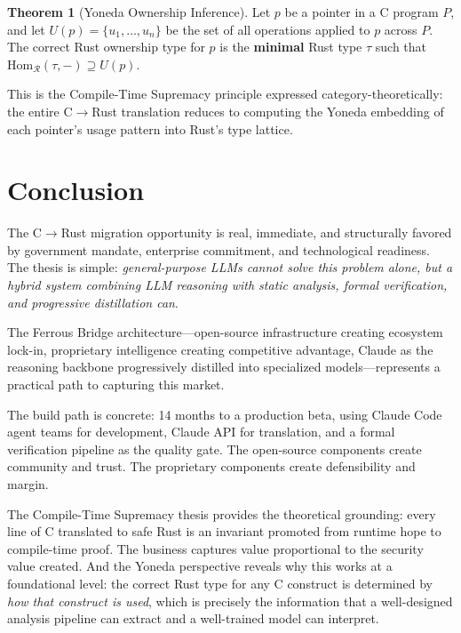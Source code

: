 \documentclass[11pt,a4paper]{article}
\theoremstyle{definition}
\newtheorem{theorem}{Theorem}[section]
\theoremstyle{remark}
\begin{document}
\begin{theorem}[Yoneda Ownership Inference]
Let $p$ be a pointer in a C program $P$, and let $U(p) = \{u_1, \ldots, u_n\}$ be the set of all operations applied to $p$ across $P$. The correct Rust ownership type for $p$ is the \textbf{minimal} Rust type $\tau$ such that $\text{Hom}_{\mathcal{R}}(\tau, -) \supseteq U(p)$.
\end{theorem}

This is the Compile-Time Supremacy principle expressed category-theoretically: the entire C$\to$Rust translation reduces to computing the Yoneda embedding of each pointer's usage pattern into Rust's type lattice.


\section{Conclusion}

The C$\to$Rust migration opportunity is real, immediate, and structurally favored by government mandate, enterprise commitment, and technological readiness. The thesis is simple: \textit{general-purpose LLMs cannot solve this problem alone, but a hybrid system combining LLM reasoning with static analysis, formal verification, and progressive distillation can}.

The Ferrous Bridge architecture---open-source infrastructure creating ecosystem lock-in, proprietary intelligence creating competitive advantage, Claude as the reasoning backbone progressively distilled into specialized models---represents a practical path to capturing this market.

The build path is concrete: 14 months to a production beta, using Claude Code agent teams for development, Claude API for translation, and a formal verification pipeline as the quality gate. The open-source components create community and trust. The proprietary components create defensibility and margin.

The Compile-Time Supremacy thesis provides the theoretical grounding: every line of C translated to safe Rust is an invariant promoted from runtime hope to compile-time proof. The business captures value proportional to the security value created. And the Yoneda perspective reveals why this works at a foundational level: the correct Rust type for any C construct is determined by \textit{how that construct is used}, which is precisely the information that a well-designed analysis pipeline can extract and a well-trained model can interpret.
\end{document}
